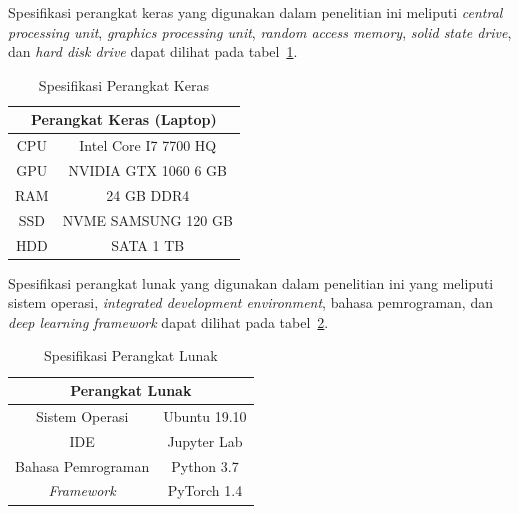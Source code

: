 Spesifikasi perangkat keras yang digunakan dalam penelitian ini meliputi \textit{central processing unit}, \textit{graphics processing unit},
\textit{random access memory}, \textit{solid state drive}, dan \textit{hard disk drive}
dapat dilihat pada tabel~\ref{tab:spesifikasiperangkatkeras}.

\pagebreak

\begin{table}[htbp]
    \captionsetup{labelfont=bf, textfont=bf}
    \caption{Spesifikasi Perangkat Keras}
    \label{tab:spesifikasiperangkatkeras}
    \vspace{-20pt}
    \begin{center}
        \begin{tabular}{|c|c|}
            \hline
            \multicolumn{2}{|c|}{\textbf{Perangkat Keras (Laptop)}} \\ \hline
            CPU & Intel Core I7 7700 HQ                             \\ \hline
            GPU & NVIDIA GTX 1060 6 GB                              \\ \hline
            RAM & 24 GB DDR4                                        \\ \hline
            SSD & NVME SAMSUNG 120 GB                               \\ \hline
            HDD & SATA 1 TB                                         \\ \hline
        \end{tabular}
    \end{center}
\end{table}


Spesifikasi perangkat lunak yang digunakan dalam penelitian ini yang meliputi sistem operasi,
\textit{integrated development environment}, bahasa pemrograman, dan \textit{deep learning framework}
dapat dilihat pada tabel~\ref{tab:spesifikasiperangkatlunak}.


\begin{table}[htbp]
    \captionsetup{labelfont=bf, textfont=bf}
    \caption{Spesifikasi Perangkat Lunak}
    \label{tab:spesifikasiperangkatlunak}
    \vspace{-20pt}
    \begin{center}
        \begin{tabular}{|c|c|}
            \hline
            \multicolumn{2}{|c|}{\textbf{Perangkat Lunak}} \\ \hline
            Sistem Operasi      & Ubuntu 19.10             \\ \hline
            IDE                 & Jupyter Lab              \\ \hline
            Bahasa Pemrograman  & Python 3.7               \\ \hline
            \textit{Framework } & PyTorch 1.4              \\ \hline
        \end{tabular}
    \end{center}
\end{table}

